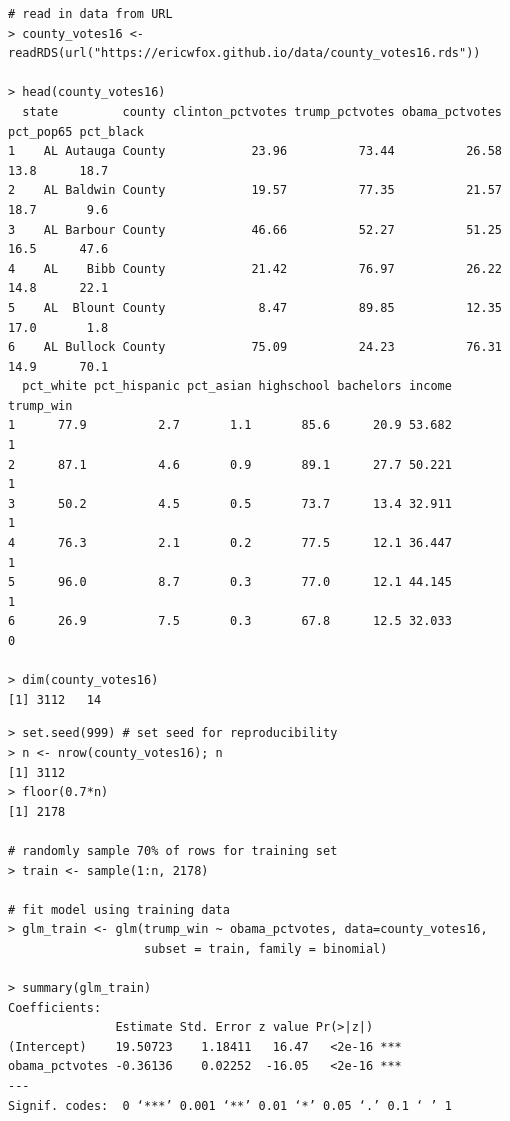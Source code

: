 \documentclass[10pt]{beamer}\usepackage[]{graphicx}\usepackage[]{color}
\begin{document}
\begin{frame}[fragile]
\scriptsize
\begin{verbatim}
# read in data from URL
> county_votes16 <- readRDS(url("https://ericwfox.github.io/data/county_votes16.rds"))

> head(county_votes16)
  state         county clinton_pctvotes trump_pctvotes obama_pctvotes pct_pop65 pct_black
1    AL Autauga County            23.96          73.44          26.58      13.8      18.7
2    AL Baldwin County            19.57          77.35          21.57      18.7       9.6
3    AL Barbour County            46.66          52.27          51.25      16.5      47.6
4    AL    Bibb County            21.42          76.97          26.22      14.8      22.1
5    AL  Blount County             8.47          89.85          12.35      17.0       1.8
6    AL Bullock County            75.09          24.23          76.31      14.9      70.1
  pct_white pct_hispanic pct_asian highschool bachelors income trump_win
1      77.9          2.7       1.1       85.6      20.9 53.682         1
2      87.1          4.6       0.9       89.1      27.7 50.221         1
3      50.2          4.5       0.5       73.7      13.4 32.911         1
4      76.3          2.1       0.2       77.5      12.1 36.447         1
5      96.0          8.7       0.3       77.0      12.1 44.145         1
6      26.9          7.5       0.3       67.8      12.5 32.033         0

> dim(county_votes16)
[1] 3112   14
\end{verbatim}
\end{frame}

\begin{frame}[fragile]
\small
\begin{verbatim}
> set.seed(999) # set seed for reproducibility
> n <- nrow(county_votes16); n
[1] 3112
> floor(0.7*n)
[1] 2178
 
# randomly sample 70% of rows for training set
> train <- sample(1:n, 2178) 
 
# fit model using training data
> glm_train <- glm(trump_win ~ obama_pctvotes, data=county_votes16,
                   subset = train, family = binomial)
                   
> summary(glm_train)
Coefficients:
               Estimate Std. Error z value Pr(>|z|)    
(Intercept)    19.50723    1.18411   16.47   <2e-16 ***
obama_pctvotes -0.36136    0.02252  -16.05   <2e-16 ***
---
Signif. codes:  0 ‘***’ 0.001 ‘**’ 0.01 ‘*’ 0.05 ‘.’ 0.1 ‘ ’ 1
\end{verbatim}
\end{frame}
\end{document}

